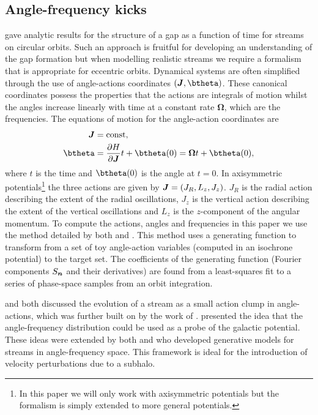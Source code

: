 \documentclass[useAMS,usenatbib,fleqn,a4paper]{mn2e}
\newcommand{\bs}[1]{\bmath{#1}}
\begin{document}
\subsection{Angle-frequency kicks}\label{Sec::Formalism_angfreq}
\cite{ErkalBelokurov2015} gave analytic results for the structure of a gap as a function of time for streams on circular orbits. Such an approach is fruitful for developing an understanding of the gap formation but when modelling realistic streams we require a formalism that is appropriate for eccentric orbits. Dynamical systems are often simplified through the use of angle-actions coordinates $(\bs{J},\btheta)$. These canonical coordinates possess the properties that the actions are integrals of motion whilst the angles increase linearly with time at a constant rate $\boldsymbol{\Omega}$, which are the frequencies. The equations of motion for the angle-action coordinates are
\begin{equation}
\begin{split}
\bs{J}&=\mathrm{const},\\
\btheta&=\frac{\partial H}{\partial\boldsymbol{J}}t+\btheta(0)=\boldsymbol{\Omega}t+\btheta(0),
\end{split}
\end{equation}
where $t$ is the time and $\btheta(0)$ is the angle at $t=0$. In axisymmetric potentials\footnote{In this paper we will only work with axisymmetric potentials but the formalism is simply extended to more general potentials.} the three actions are given by $\bs{J}=(J_R,L_z,J_z)$. $J_R$ is the radial action describing the extent of the radial oscillations, $J_z$ is the vertical action describing the extent of the vertical oscillations and $L_z$ is the $z$-component of the angular momentum. To compute the actions, angles and frequencies in this paper we use the method detailed by both \cite{SandersBinney2014} and \cite{Bovy2014}. This method uses a generating function to transform from a set of toy angle-action variables (computed in an isochrone potential) to the target set. The coefficients of the generating function (Fourier components $S_{\bs{n}}$ and their derivatives) are found from a least-squares fit to a series of phase-space samples from an orbit integration.

\cite{HelmiWhite1999} and \cite{Tremaine1999} both discussed the evolution of a stream as a small action clump in angle-actions, which was further built on by the work of \cite{EyreBinney2011}. \cite{SandersBinney2013b} presented the idea that the angle-frequency distribution could be used as a probe of the galactic potential. These ideas were extended by both \cite{Bovy2014} and \cite{Sanders2014} who developed generative models for streams in angle-frequency space. This framework is ideal for the introduction of velocity perturbations due to a subhalo.
\end{document}
